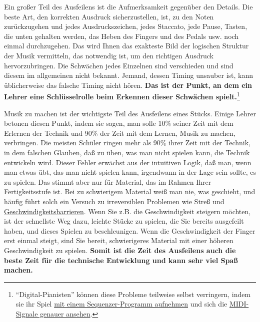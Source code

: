 Ein großer Teil des Ausfeilens ist die Aufmerksamkeit gegenüber den Details.
Die beste Art, den korrekten Ausdruck sicherzustellen, ist, zu den Noten zurückzugehen und jedes Ausdruckszeichen, jedes Staccato, jede Pause, Tasten, die unten gehalten werden, das Heben des Fingers und des Pedals usw. noch einmal durchzugehen.
Das wird Ihnen das exakteste Bild der logischen Struktur der Musik vermitteln, das notwendig ist, um den richtigen Ausdruck hervorzubringen.
Die Schwächen jedes Einzelnen sind verschieden und sind diesem im allgemeinen nicht bekannt.
Jemand, dessen Timing unsauber ist, kann üblicherweise das falsche Timing nicht hören.
\textbf{Das ist der Punkt, an dem ein Lehrer eine Schlüsselrolle beim Erkennen dieser Schwächen spielt.}\footnote{\enquote{Digital-Pianisten} können diese Probleme teilweise selbst verringern, indem sie ihr Spiel \hyperlink{c1iii13MIDI}{mit einem Sequenzer-Programm aufnehmen} und sich die \hyperlink{midi_check}{MIDI-Signale genauer ansehen}.}

Musik zu machen ist der wichtigste Teil des Ausfeilens eines Stücks.
Einige Lehrer betonen diesen Punkt, indem sie sagen, man solle 10\% seiner Zeit mit dem Erlernen der Technik und 90\% der Zeit mit dem Lernen, Musik zu machen, verbringen.
Die meisten Schüler ringen mehr als 90\% ihrer Zeit mit der Technik, in dem falschen Glauben, daß zu üben, was man nicht spielen kann, die Technik entwickeln wird.
Dieser Fehler erwächst aus der intuitiven Logik, daß man, wenn man etwas übt, das man nicht spielen kann, irgendwann in der Lage sein sollte, es zu spielen.
Das stimmt aber nur für Material, das im Rahmen Ihrer Fertigkeitsstufe ist.
Bei zu schwierigem Material weiß man nie, was geschieht, und häufig führt solch ein Versuch zu irreversiblen Problemen wie Streß und \hyperlink{c1iv2b}{Geschwindigkeitsbarrieren}.
Wenn Sie z.B. die Geschwindigkeit steigern möchten, ist der schnellste Weg dazu, leichte Stücke zu spielen, die Sie bereits ausgefeilt haben, und dieses Spielen zu beschleunigen.
Wenn die Geschwindigkeit der Finger erst einmal steigt, sind Sie bereit, schwierigeres Material mit einer höheren Geschwindigkeit zu spielen.
\textbf{Somit ist die Zeit des Ausfeilens auch die beste Zeit für die technische Entwicklung und kann sehr viel Spaß machen.}

